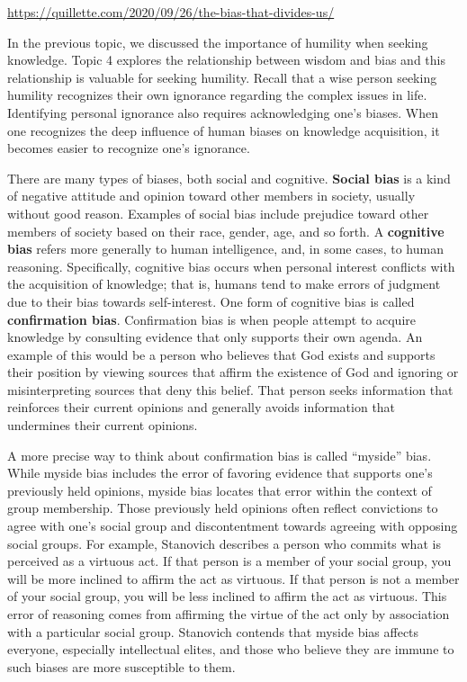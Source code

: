 \documentclass[
]{book}
\begin{document}
\begin{reflect}
\url{https://quillette.com/2020/09/26/the-bias-that-divides-us/}
\end{reflect}

In the previous topic, we discussed the importance of humility when seeking knowledge. Topic 4 explores the relationship between wisdom and bias and this relationship is valuable for seeking humility. Recall that a wise person seeking humility recognizes their own ignorance regarding the complex issues in life. Identifying personal ignorance also requires acknowledging one's biases. When one recognizes the deep influence of human biases on knowledge acquisition, it becomes easier to recognize one's ignorance.

There are many types of biases, both social and cognitive. \textbf{Social bias} is a kind of negative attitude and opinion toward other members in society, usually without good reason. Examples of social bias include prejudice toward other members of society based on their race, gender, age, and so forth. A \textbf{cognitive bias} refers more generally to human intelligence, and, in some cases, to human reasoning. Specifically, cognitive bias occurs when personal interest conflicts with the acquisition of knowledge; that is, humans tend to make errors of judgment due to their bias towards self-interest. One form of cognitive bias is called \textbf{confirmation bias}. Confirmation bias is when people attempt to acquire knowledge by consulting evidence that only supports their own agenda. An example of this would be a person who believes that God exists and supports their position by viewing sources that affirm the existence of God and ignoring or misinterpreting sources that deny this belief. That person seeks information that reinforces their current opinions and generally avoids information that undermines their current opinions.

A more precise way to think about confirmation bias is called ``myside'' bias. While myside bias includes the error of favoring evidence that supports one's previously held opinions, myside bias locates that error within the context of group membership. Those previously held opinions often reflect convictions to agree with one's social group and discontentment towards agreeing with opposing social groups. For example, Stanovich describes a person who commits what is perceived as a virtuous act. If that person is a member of your social group, you will be more inclined to affirm the act as virtuous. If that person is not a member of your social group, you will be less inclined to affirm the act as virtuous. This error of reasoning comes from affirming the virtue of the act only by association with a particular social group. Stanovich contends that myside bias affects everyone, especially intellectual elites, and those who believe they are immune to such biases are more susceptible to them.
\end{document}
